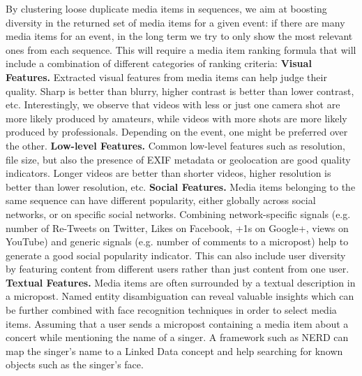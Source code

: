 By clustering loose duplicate media items in sequences, we aim at boosting diversity in the returned set of media items for a given event: if there are many media items for an event, in the long term we try to only show the most relevant ones from each sequence. This will require a media item ranking formula that will include a combination of different categories of ranking criteria:
\newline
\textbf{Visual Features.} Extracted visual features from media items can help judge their quality. Sharp is better than blurry, higher contrast is better than lower contrast, etc. Interestingly, we observe that videos with less or just one camera shot are more likely produced by amateurs, while videos with more shots are more likely produced by professionals. Depending on the event, one might be preferred over the other.
\newline
\textbf{Low-level Features.} Common low-level features such as resolution, file size, but also the presence of EXIF metadata or geolocation are good quality indicators. Longer videos are better than shorter videos, higher resolution is better than lower resolution, etc.
\newline
\textbf{Social Features.} Media items belonging to the same sequence can have different popularity, either globally across social networks, or on specific social networks. Combining network-specific signals (e.g. number of Re-Tweets on Twitter, Likes on Facebook, +1s on Google+, views on YouTube) and generic signals (e.g. number of comments to a micropost) help to generate a good social popularity indicator. This can also include user diversity by featuring content from different users rather than just content from one user.
\newline
\textbf{Textual Features.} Media items are often surrounded by a textual description in a micropost. Named entity disambiguation can reveal valuable insights which can be further combined with face recognition techniques in order to select media items. Assuming that a user sends a micropost containing a media item about a concert while mentioning the name of a singer. A framework such as NERD can map the singer's name to a Linked Data concept and help searching for known objects such as the singer's face.

